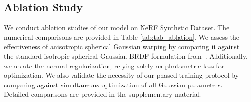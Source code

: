 \subsection{Ablation Study}
\label{sec:exp_ablation}


We conduct ablation studies of our model on NeRF Synthetic Dataset. The numerical comparisons are provided in Table \ref{tab:tab_ablation}. We assess the effectiveness of anisotropic spherical Gaussian warping by comparing it against the standard isotropic spherical Gaussian BRDF formulation from~\cite{wang2009all}. Additionally, we ablate the normal regularization, relying solely on photometric loss for optimization. We also validate the necessity of our phased training protocol by comparing against simultaneous optimization of all Gaussian parameters. Detailed comparisons are provided in the supplementary material. 